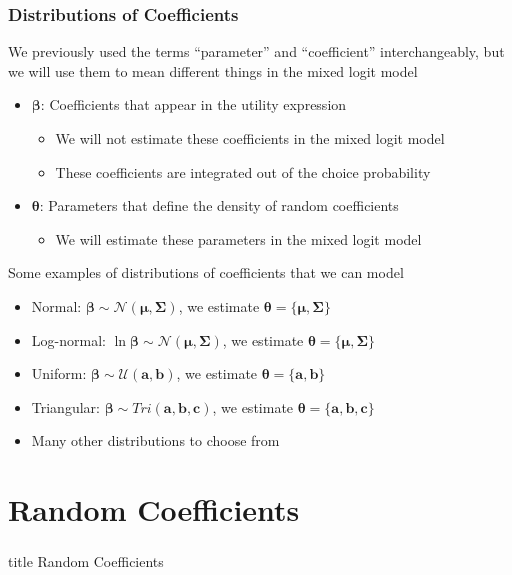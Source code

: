 \documentclass{beamer}
\begin{document}
\begin{frame}\frametitle{Distributions of Coefficients}
    We previously used the terms ``parameter'' and ``coefficient'' interchangeably, but we will use them to mean different things in the mixed logit model
    \begin{itemize}
        \item $\bm{\beta}$: Coefficients that appear in the utility expression
        \begin{itemize}
            \item We will not estimate these coefficients in the mixed logit model
            \item These coefficients are integrated out of the choice probability
        \end{itemize}
        \item $\bm{\theta}$: Parameters that define the density of random coefficients
        \begin{itemize}
            \item We will estimate these parameters in the mixed logit model
        \end{itemize}
    \end{itemize}
    \vspace{2ex}
    Some examples of distributions of coefficients that we can model
    \begin{itemize}
        \item Normal: $\bm{\beta} \sim \mathcal{N}(\bm{\mu}, \bm{\Sigma})$, we estimate $\bm{\theta} = \{\bm{\mu}, \bm{\Sigma}\}$
        \item Log-normal: $\ln \bm{\beta} \sim \mathcal{N}(\bm{\mu}, \bm{\Sigma})$, we estimate $\bm{\theta} = \{\bm{\mu}, \bm{\Sigma}\}$
        \item Uniform: $\bm{\beta} \sim \mathcal{U}(\bm{a}, \bm{b})$, we estimate $\bm{\theta} = \{\bm{a}, \bm{b}\}$
        \item Triangular: $\bm{\beta} \sim Tri(\bm{a}, \bm{b}, \bm{c})$, we estimate $\bm{\theta} = \{\bm{a}, \bm{b}, \bm{c}\}$
        \item Many other distributions to choose from
    \end{itemize}
\end{frame}

\section{Random Coefficients}
\label{random}
\begin{frame}\frametitle{}
    \vfill
    \centering
    \begin{beamercolorbox}[center]{title}
        \Large Random Coefficients
    \end{beamercolorbox}
    \vfill
\end{frame}
\end{document}
